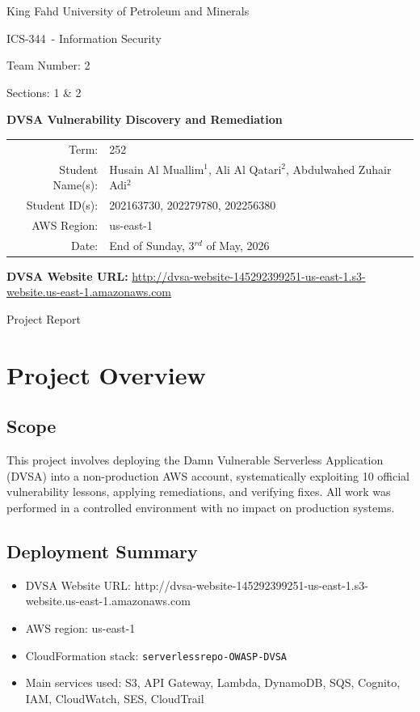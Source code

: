 \documentclass[12pt]{report}
\newcommand{\CourseCode}{ICS-344}
\newcommand{\CourseTitle}{Information Security}
\newcommand{\TeamNo}{2}
\newcommand{\CourseSection}{Sections: 1 \& 2}
\newcommand{\CourseTerm}{252}
\newcommand{\ProjectTitle}{DVSA Vulnerability Discovery and Remediation}
\newcommand{\StudentNames}{Husain Al Muallim$^1$, Ali Al Qatari$^2$, Abdulwahed Zuhair Adi$^2$}
\newcommand{\StudentIDs}{202163730, 202279780, 202256380}
\newcommand{\DVSAWebsiteURL}{http://dvsa-website-145292399251-us-east-1.s3-website.us-east-1.amazonaws.com}
\newcommand{\AWSRegion}{us-east-1}
\newcommand{\SubmissionDate}{End of Sunday, 3$^{rd}$ of May, 2026}
\begin{document}
\hypersetup{pageanchor=false}
\begin{titlepage}
  \centering
  {\Large King Fahd University of Petroleum and Minerals\par}
  \vspace{1.2cm}
  {\Large \CourseCode\ - \CourseTitle\par}
  {\large Team Number: \TeamNo\par}
  {\large \CourseSection\par}
  \vspace{1.4cm}
  {\huge \bfseries \ProjectTitle\par}
  \vspace{1.4cm}

  \begin{tabularx}{\textwidth}{@{}rY@{}}
    Term: & \CourseTerm \\
    Student Name(s): & \StudentNames \\
    Student ID(s): & \StudentIDs \\
    AWS Region: & \AWSRegion \\
    Date: & \SubmissionDate \\
  \end{tabularx}

  \vspace{0.6cm}
  {\small\textbf{DVSA Website URL:} \url{\DVSAWebsiteURL}\par}

  \vfill
  {\large Project Report\par}
\end{titlepage}

\clearpage
\hypersetup{pageanchor=true}
\tableofcontents
\clearpage

\chapter*{Project Overview}

\section*{Scope}
This project involves deploying the Damn Vulnerable Serverless Application (DVSA) into a non-production AWS account, systematically exploiting 10 official vulnerability lessons, applying remediations, and verifying fixes. All work was performed in a controlled environment with no impact on production systems.

\section*{Deployment Summary}
\begin{itemize}
  \item DVSA Website URL: \DVSAWebsiteURL
  \item AWS region: \AWSRegion
  \item CloudFormation stack: \texttt{serverlessrepo-OWASP-DVSA}
  \item Main services used: S3, API Gateway, Lambda, DynamoDB, SQS, Cognito, IAM, CloudWatch, SES, CloudTrail
\end{itemize}
\end{document}
